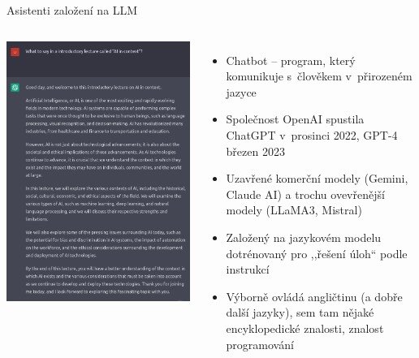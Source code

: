 \documentclass[aspectratio=169,dvipsnames]{beamer}
\begin{document}
\begin{frame}{Asistenti založení na LLM}

    \begin{columns}

        \includegraphics[width=\textwidth]{img/ChatGPT.png}

    \begin{itemize}[<+->]

        \item Chatbot -- program, který komunikuje s~člověkem v~přirozeném jazyce

        \item Společnost OpenAI spustila ChatGPT v~prosinci 2022, GPT-4 březen 2023

		\item Uzavřené komerční modely (Gemini, Claude AI) a trochu ovevřenější modely (LLaMA3, Mistral)

        \item Založený na jazykovém modelu dotrénovaný pro ,,řešení úloh`` podle instrukcí

        \item Výborně ovládá angličtinu (a dobře další jazyky), sem tam nějaké encyklopedické
            znalosti, znalost programování

    \end{itemize}

    \end{columns}

\end{frame}
\end{document}
